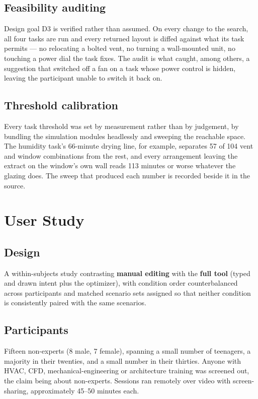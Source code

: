 \documentclass[manuscript,review,anonymous]{acmart}
\begin{document}
\subsection{Feasibility auditing}

Design goal D3 is verified rather than assumed. On every change to the search,
all four tasks are run and every returned layout is diffed against what its task
permits --- no relocating a bolted vent, no turning a wall-mounted unit, no
touching a power dial the task fixes. The audit is what caught, among others, a
suggestion that switched off a fan on a task whose power control is hidden,
leaving the participant unable to switch it back on.

\subsection{Threshold calibration}

Every task threshold was set by measurement rather than by judgement, by
bundling the simulation modules headlessly and sweeping the reachable space. The
humidity task's 66-minute drying line, for example, separates 57 of 104 vent and
window combinations from the rest, and every arrangement leaving the extract on
the window's own wall reads 113 minutes or worse whatever the glazing does. The
sweep that produced each number is recorded beside it in the source.

\section{User Study}
\label{sec:study}

\subsection{Design}

A within-subjects study contrasting \textbf{manual editing} with the
\textbf{full tool} (typed and drawn intent plus the optimizer), with condition
order counterbalanced across participants and matched scenario sets assigned so
that neither condition is consistently paired with the same scenarios.

\subsection{Participants}

Fifteen non-experts (8 male, 7 female), spanning a small number of teenagers, a
majority in their twenties, and a small number in their thirties. Anyone with
HVAC, CFD, mechanical-engineering or architecture training was screened out, the
claim being about non-experts. Sessions ran remotely over video with
screen-sharing, approximately 45--50 minutes each.
\end{document}
